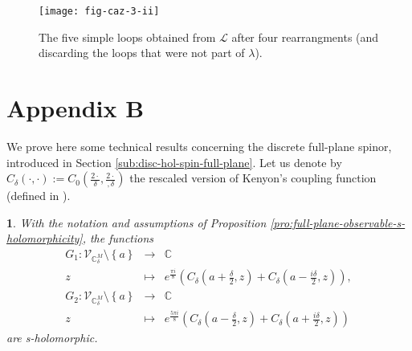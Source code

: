 \documentclass[oneside,english]{amsart}
\numberwithin{equation}{section}
\numberwithin{figure}{section}
\theoremstyle{plain}
\theoremstyle{plain}
\theoremstyle{plain}
\theoremstyle{plain}
\theoremstyle{plain}
\newtheorem{lem}[thm]{\protect\lemmaname}
\theoremstyle{definition}
\theoremstyle{remark}
\providecommand{\lemmaname}{Lemma}
\begin{document}
\begin{figure}
\texttt{[image: fig-caz-3-ii]}

\caption{\label{fig:configuration-loops}The five simple loops obtained from
$\mathcal{L}$ after four rearrangments (and discarding the loops
that were not part of $\lambda$).}
\end{figure}



\section*{Appendix B}

We prove here some technical results concerning the discrete full-plane
spinor, introduced in Section \ref{sub:disc-hol-spin-full-plane}.
Let us denote by $C_{\delta}\left(\cdot,\cdot\right):=C_{0}\left(\frac{2\cdot}{\delta},\frac{2\cdot}{,\delta}\right)$
the rescaled version of Kenyon's coupling function (defined in \cite{kenyon-i}).
\begin{lem}
\label{lem:full-plane-obs-s-hol}With the notation and assumptions
of Proposition \ref{pro:full-plane-observable-s-holomorphicity},
the functions 
\begin{eqnarray*}
G_{1}:\mathcal{V}_{\mathbb{C}_{\delta}^{M}}\setminus\left\{ a\right\}  & \to & \mathbb{C}\\
z & \mapsto & e^{\frac{\pi i}{8}}\left(C_{\delta}\left(a+\frac{\delta}{2},z\right)+C_{\delta}\left(a-\frac{i\delta}{2},z\right)\right),\\
G_{2}:\mathcal{V}_{\mathbb{C}_{\delta}^{M}}\setminus\left\{ a\right\}  & \to & \mathbb{C}\\
z & \mapsto & e^{\frac{5\pi i}{8}}\left(C_{\delta}\left(a-\frac{\delta}{2},z\right)+C_{\delta}\left(a+\frac{i\delta}{2},z\right)\right)
\end{eqnarray*}
 are s-holomorphic.\end{lem}
\end{document}
